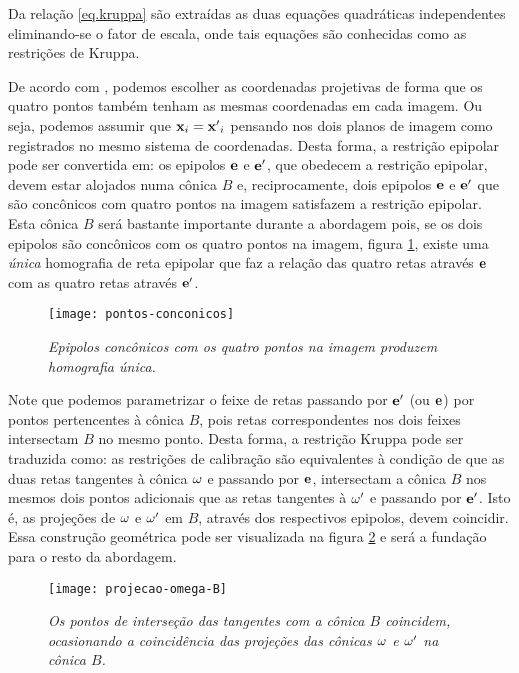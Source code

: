 Da relação \ref{eq.kruppa} são extraídas as duas equações quadráticas independentes eliminando-se o fator de escala, onde tais equações são conhecidas como as restrições de Kruppa. 




De acordo com \cite{kneebone}, podemos escolher as coordenadas projetivas de forma que os quatro pontos também tenham as mesmas coordenadas em cada imagem. Ou seja, podemos assumir que ${\bf x}_i = {\bf x'}_i$ pensando nos dois planos de imagem como registrados no mesmo sistema de coordenadas. Desta forma, a restrição epipolar pode ser convertida em: os epipolos ${\bf e}$ e ${\bf e'}$, que obedecem a restrição epipolar, devem estar alojados numa cônica $B$ e, reciprocamente, dois epipolos ${\bf e}$ e ${\bf e'}$ que são concônicos com quatro pontos na imagem satisfazem a restrição epipolar. Esta cônica $B$ será bastante importante durante a abordagem pois, se os dois epipolos são concônicos com os quatro pontos na imagem, figura \ref{pontos-conconicos}, existe uma \textit{única} homografia de reta epipolar que faz a relação das quatro retas através ${\bf e}$ com as quatro retas através ${\bf e'}$. 

\begin{figure}[!htb]
\centering
\texttt{[image: pontos-conconicos]}
\caption{\textit{Epipolos concônicos com os quatro pontos na imagem produzem homografia única.}}
\label{pontos-conconicos}
\end{figure}

Note que podemos parametrizar o feixe de retas passando por ${\bf e'}$ (ou ${\bf e}$) por pontos pertencentes à cônica $B$, pois retas correspondentes nos dois feixes intersectam $B$ no mesmo ponto. Desta forma, a restrição Kruppa pode ser traduzida como: as restrições de calibração são equivalentes à condição de que as duas retas tangentes à cônica ${\bf \omega}$ e passando por ${\bf e}$, intersectam a cônica $B$ nos mesmos dois pontos adicionais que as retas tangentes à ${\bf \omega'}$ e passando por ${\bf e'}$. Isto é, as projeções de ${\bf \omega}$ e ${\bf \omega'}$ em $B$, através dos respectivos epipolos, devem coincidir. Essa construção geométrica pode ser visualizada na figura \ref{omega-B} e será a fundação para o resto da abordagem. 

\begin{figure}[!htb]
\centering
\texttt{[image: projecao-omega-B]}
\caption{\textit{Os pontos de interseção das tangentes com a cônica $B$ coincidem, ocasionando a coincidência das projeções das cônicas ${\bf \omega}$ e ${\bf \omega'}$ na cônica $B$.}}
\label{omega-B}
\end{figure}

